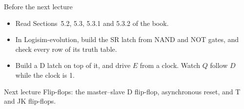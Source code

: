 \documentclass[10pt]{wosm-slides}
\begin{document}
\begin{frame}{Before the next lecture}
  \begin{itemize}
    \item Read Sections~5.2, 5.3, 5.3.1 and 5.3.2 of the book.
    \item In Logisim-evolution, build the SR latch from NAND and NOT gates, and check
      every row of its truth table.
    \item Build a D latch on top of it, and drive $E$ from a clock. Watch $Q$ follow $D$
      while the clock is 1.
  \end{itemize}

  \begin{block}{Next lecture }
    Flip-flops: the master--slave D flip-flop, asynchronous reset, and T and JK
    flip-flops.
  \end{block}
\end{frame}
\end{document}
